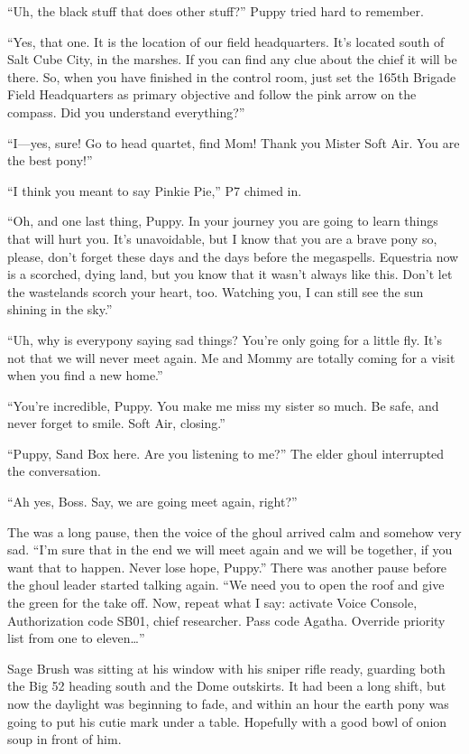``Uh, the black stuff that does other stuff?'' Puppy tried hard to remember.

``Yes, that one. It is the location of our field headquarters. It's located south of Salt Cube City, in the marshes. If you can find any clue about the chief it will be there. So, when you have finished in the control room, just set the 165th Brigade Field Headquarters as primary objective and follow the pink arrow on the compass. Did you understand everything?''

``I---yes, sure! Go to head quartet, find Mom! Thank you Mister Soft Air. You are the best pony!''

``I think you meant to say Pinkie Pie,'' P7 chimed in.

``Oh, and one last thing, Puppy. In your journey you are going to learn things that will hurt you. It's unavoidable, but I know that you are a brave pony so, please, don't forget these days and the days before the megaspells. Equestria now is a scorched, dying land, but you know that it wasn't always like this. Don't let the wastelands scorch your heart, too. Watching you, I can still see the sun shining in the sky.''

``Uh, why is everypony saying sad things? You're only going for a little fly. It's not that we will never meet again. Me and Mommy are totally coming for a visit when you find a new home.''

``You're incredible, Puppy. You make me miss my sister so much. Be safe, and never forget to smile. Soft Air, closing.''

``Puppy, Sand Box here. Are you listening to me?'' The elder ghoul interrupted the conversation.

``Ah yes, Boss. Say, we are going meet again, right?''

The was a long pause, then the voice of the ghoul arrived calm and somehow very sad. ``I'm sure that in the end we will meet again and we will be together, if you want that to happen. Never lose hope, Puppy.'' There was another pause before the ghoul leader started talking again. ``We need you to open the roof and give the green for the take off. Now, repeat what I say: activate Voice Console, Authorization code SB01, chief researcher. Pass code Agatha. Override priority list from one to eleven\dots''


\horizonline


Sage Brush was sitting at his window with his sniper rifle ready, guarding both the Big 52 heading south and the Dome outskirts. It had been a long shift, but now the daylight was beginning to fade, and within an hour the earth pony was going to put his cutie mark under a table. Hopefully with a good bowl of onion soup in front of him.

